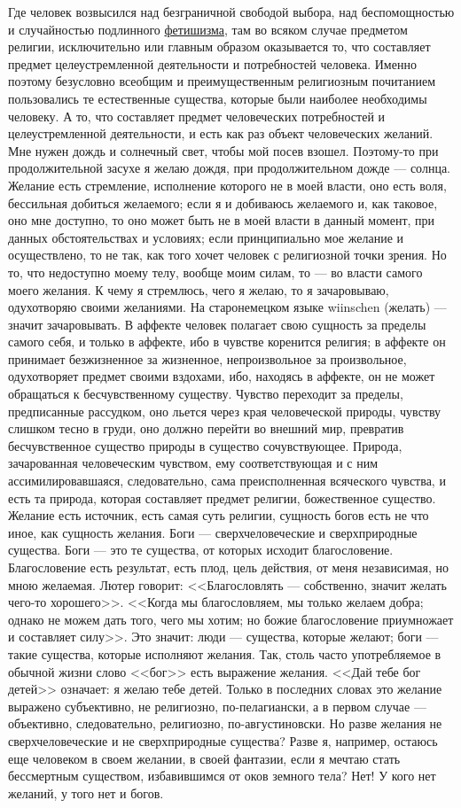 \documentclass[12pt,oneside]{book}
\begin{document}
Где человек возвысился над безграничной свободой выбора, над беспомощностью и случайностью подлинного \underline{фетишизма}, там во всяком случае предметом религии, исключительно или главным образом оказывается то, что составляет предмет целеустремленной деятельности и потребностей человека. Именно поэтому безусловно всеобщим и преимущественным религиозным почитанием пользовались те естественные существа, которые были наиболее необходимы человеку. А то, что составляет предмет человеческих потребностей и целеустремленной деятельности, и есть как раз объект человеческих желаний. Мне нужен дождь и солнечный свет, чтобы мой посев взошел. Поэтому-то при продолжительной засухе я желаю дождя, при продолжительном дожде --- солнца. Желание есть стремление, исполнение которого не в моей власти, оно есть воля, бессильная добиться желаемого; если я и добиваюсь желаемого и, как таковое, оно мне доступно, то оно может быть не в моей власти в данный момент, при данных обстоятельствах и условиях; если принципиально мое желание и осуществлено, то не так, как того хочет человек с религиозной точки зрения. Но то, что недоступно моему телу, вообще моим силам, то --- во власти самого моего желания. К чему я стремлюсь, чего я желаю, то я зачаровываю, одухотворяю своими желаниями. На старонемецком языке wiinschen (желать) --- значит зачаровывать. В аффекте человек полагает свою сущность за пределы самого себя, и только в аффекте, ибо в чувстве коренится религия; в аффекте он принимает безжизненное за жизненное, непроизвольное за произвольное, одухотворяет предмет своими вздохами, ибо, находясь в аффекте, он не может обращаться к бесчувственному существу. Чувство переходит за пределы, предписанные рассудком, оно льется через края человеческой природы, чувству слишком тесно в груди, оно должно перейти во внешний мир, превратив бесчувственное существо природы в существо сочувствующее. Природа, зачарованная человеческим чувством, ему соответствующая и с ним ассимилировавшаяся, следовательно, сама преисполненная всяческого чувства, и есть та природа, которая составляет предмет религии, божественное существо. Желание есть источник, есть самая суть религии, сущность богов есть не что иное, как сущность желания. Боги --- сверхчеловеческие и сверхприродные существа. Боги --- это те существа, от которых исходит благословение. Благословение есть результат, есть плод, цель действия, от меня независимая, но мною желаемая. Лютер говорит: <<Благословлять --- собственно, значит желать чего-то хорошего>>. <<Когда мы благословляем, мы только желаем добра; однако не можем дать того, чего мы хотим; но божие благословение приумножает и составляет силу>>. Это значит: люди --- существа, которые желают; боги --- такие существа, которые исполняют желания. Так, столь часто употребляемое в обычной жизни слово <<бог>> есть выражение желания. <<Дай тебе бог детей>> означает: я желаю тебе детей. Только в последних словах это желание выражено субъективно, не религиозно, по-пелагиански, а в первом случае --- объективно, следовательно, религиозно, по-августиновски. Но разве желания не сверхчеловеческие и не сверхприродные существа? Разве я, например, остаюсь еще человеком в своем желании, в своей фантазии, если я мечтаю стать бессмертным существом, избавившимся от оков земного тела? Нет! У кого нет желаний, у того нет и богов. 
\end{document}

